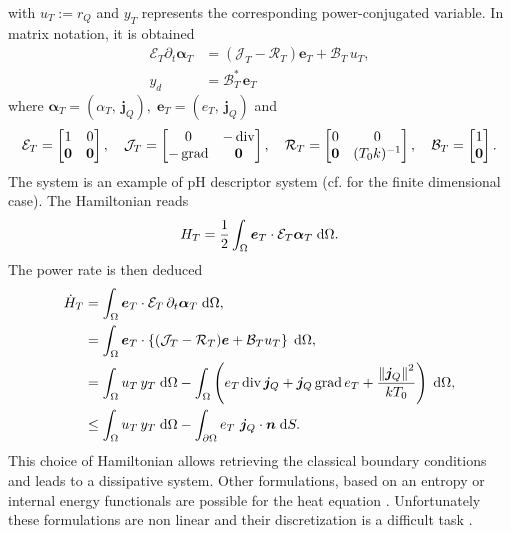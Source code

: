 with $u_T:=r_Q$ and $y_T$ represents the corresponding power-conjugated variable. In matrix notation, it is obtained
\begin{equation}
\begin{aligned}
\mathcal{E}_T \partial_{t} \bm{\alpha}_T  &= \left(\mathcal{J}_T - \mathcal{R}_T \right)\bm{e}_T + \mathcal{B}_{T}\, u_T, \\
y_d &= \mathcal{B}_{T}^* \, \bm{e}_T
\end{aligned}
\end{equation}
where $\bm{\alpha}_T = (\alpha_T,\ \bm{j}_Q), \; \bm{e}_T = (e_T,\ \bm{j}_Q)$ and
\begin{equation*}
\mathcal{E}_T = \begin{bmatrix}
1 & 0 \\
\bm{0} & \bm{0} \\
\end{bmatrix}, \quad
\mathcal{J}_T = \begin{bmatrix}
0 & -\operatorname{div} \\
-\operatorname*{grad} & \bm{0} \\
\end{bmatrix}, \quad 
\mathcal{R}_T = \begin{bmatrix}
0 & 0 \\
\bm{0} & (T_0 k)^{-1} \\
\end{bmatrix}, \quad
\mathcal{B}_T = \begin{bmatrix}
1 \\
\bm{0} \\
\end{bmatrix}.
\end{equation*}
The system is an example of pH descriptor system (cf. \cite{beattie2018linear} for the finite dimensional case). The Hamiltonian reads 
\begin{equation}\label{eq:hamHeat}
	H_T = \frac{1}{2}\int_\Omega \bm{e}_T \cdot \mathcal{E}_T\bm{\alpha}_T \d\Omega.
\end{equation}
The power rate is then deduced
\begin{equation}\label{eq:enrateHeat}
\begin{aligned}
\dot{H}_T &= \int_\Omega \bm{e}_T \cdot \mathcal{E}_T\, \partial_t \bm{\alpha}_T \d\Omega, \\
		&= \int_\Omega \bm{e}_T \cdot \left\{(\mathcal{J}_T-\mathcal{R}_T) \bm{e} + \mathcal{B}_T u_T \right\} \d\Omega, \\
		&= \int_\Omega u_T \, y_T \d\Omega -\int_\Omega \left(e_T \div \bm{j}_Q + \bm{j}_Q \grad e_T + \frac{\norm{\bm{j}_Q}^2}{k T_0} \right) \d\Omega, \\
		&\le \int_\Omega u_T \, y_T \d\Omega -\int_{\partial\Omega} e_T \ \bm{j}_Q \cdot \bm{n} \d{S}.
\end{aligned}
\end{equation}
This choice of Hamiltonian allows retrieving the classical boundary conditions and leads to a dissipative system. Other formulations, based on an entropy or internal energy functionals are possible for the heat equation \cite{duindam2009,serhani2019modeling}. Unfortunately these formulations are non linear and their discretization is a difficult task \cite{serhani2019discretization}. 


